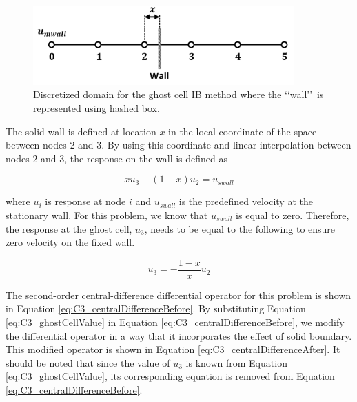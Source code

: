 \begin{figure}[H]
	\centering
	\includegraphics[width=10.00cm]{Chapter_3/figure/ghost_cell_discretization.png}
	\caption{Discretized domain for the ghost cell IB method where the \lq\lq wall\rq\rq\ is represented using hashed box.}
	\label{fig:C3_discretizedGhostCell}
\end{figure}

The solid wall is defined at location $x$ in the local coordinate of the space between nodes $2$ and $3$. By using this coordinate and linear interpolation between nodes $2$ and $3$, the response on the wall is defined as

\begin{equation}
	x u_3 + (1 - x) u_2 = u_{swall}
\end{equation}

where $u_i$ is response at node $i$ and $u_{swall}$ is the predefined velocity at the stationary wall. For this problem, we know that $u_{swall}$ is equal to zero. Therefore, the response at the ghost cell, $u_3$, needs to be equal to the following to ensure zero velocity on the fixed wall.

\begin{equation}\label{eq:C3_ghostCellValue}
	u_3 = -\frac{1 - x}{x} u_2
\end{equation}

The second-order central-difference differential operator for this problem is shown in Equation \eqref{eq:C3_centralDifferenceBefore}. By substituting Equation \eqref{eq:C3_ghostCellValue} in Equation \eqref{eq:C3_centralDifferenceBefore}, we modify the differential operator in a way that it incorporates the effect of solid boundary. This modified operator is shown in Equation \eqref{eq:C3_centralDifferenceAfter}. It should be noted that since the value of $u_3$ is known from Equation \eqref{eq:C3_ghostCellValue}, its corresponding equation is removed from Equation \eqref{eq:C3_centralDifferenceBefore}.

